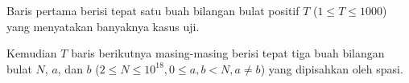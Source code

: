 Baris pertama berisi tepat satu buah bilangan bulat positif $T$ ($1 \le T \le 1000$) yang menyatakan banyaknya kasus uji.

Kemudian $T$ baris berikutnya masing-masing berisi tepat tiga buah bilangan bulat $N$, $a$, dan $b$ ($2\leq{N}\leq{10^{18}}, 0 \le a,b<{N},a\neq{b}$) yang dipisahkan oleh spasi.

